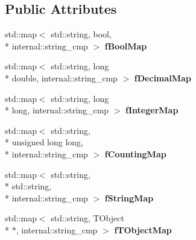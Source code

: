 \subsection*{Public Attributes}
\begin{DoxyCompactItemize}
\item 
\hypertarget{class_h_a_l_1_1_analysis_data_adc7232f1a112de23d2b557740422ec9f}{std\-::map$<$ std\-::string, bool, \\*
internal\-::string\-\_\-cmp $>$ {\bfseries f\-Bool\-Map}}\label{class_h_a_l_1_1_analysis_data_adc7232f1a112de23d2b557740422ec9f}

\item 
\hypertarget{class_h_a_l_1_1_analysis_data_a79170e31902d40d73d6838b816e74dc8}{std\-::map$<$ std\-::string, long \\*
double, internal\-::string\-\_\-cmp $>$ {\bfseries f\-Decimal\-Map}}\label{class_h_a_l_1_1_analysis_data_a79170e31902d40d73d6838b816e74dc8}

\item 
\hypertarget{class_h_a_l_1_1_analysis_data_a5487671b851b8ce89298d7f770ab8f34}{std\-::map$<$ std\-::string, long \\*
long, internal\-::string\-\_\-cmp $>$ {\bfseries f\-Integer\-Map}}\label{class_h_a_l_1_1_analysis_data_a5487671b851b8ce89298d7f770ab8f34}

\item 
\hypertarget{class_h_a_l_1_1_analysis_data_a6f29542f7f2cd7e7377c56ac54592dd5}{std\-::map$<$ std\-::string, \\*
unsigned long long, \\*
internal\-::string\-\_\-cmp $>$ {\bfseries f\-Counting\-Map}}\label{class_h_a_l_1_1_analysis_data_a6f29542f7f2cd7e7377c56ac54592dd5}

\item 
\hypertarget{class_h_a_l_1_1_analysis_data_a3256b3efc77655ba25cc34a6986c00d5}{std\-::map$<$ std\-::string, \\*
std\-::string, \\*
internal\-::string\-\_\-cmp $>$ {\bfseries f\-String\-Map}}\label{class_h_a_l_1_1_analysis_data_a3256b3efc77655ba25cc34a6986c00d5}

\item 
\hypertarget{class_h_a_l_1_1_analysis_data_a913d66198c57cc2bd9f0e3e5d904e33f}{std\-::map$<$ std\-::string, T\-Object \\*
$\ast$, internal\-::string\-\_\-cmp $>$ {\bfseries f\-T\-Object\-Map}}\label{class_h_a_l_1_1_analysis_data_a913d66198c57cc2bd9f0e3e5d904e33f}


\end{DoxyCompactItemize}
